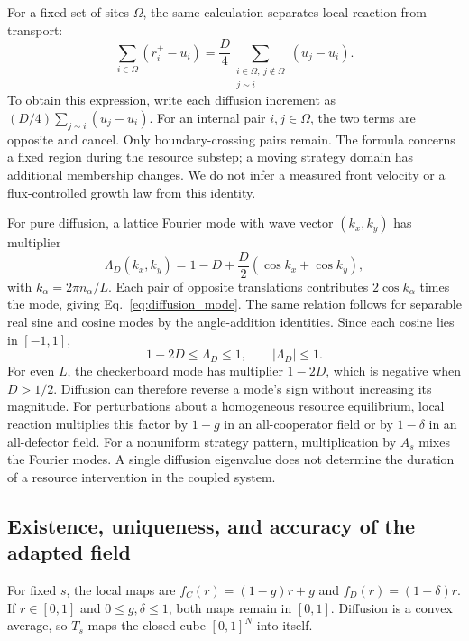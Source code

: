 For a fixed set of sites $\Omega$, the same calculation separates local reaction from transport:
\begin{equation}
\label{eq:flux}
\sum_{i\in\Omega}(r_i^+-u_i)
=\frac D4
\sum_{\substack{i\in\Omega,\ j\notin\Omega\\j\sim i}}
(u_j-u_i).
\end{equation}
To obtain this expression, write each diffusion increment as $(D/4)\sum_{j\sim i}(u_j-u_i)$. For an internal pair $i,j\in\Omega$, the two terms are opposite and cancel. Only boundary-crossing pairs remain. The formula concerns a fixed region during the resource substep; a moving strategy domain has additional membership changes. We do not infer a measured front velocity or a flux-controlled growth law from this identity.

For pure diffusion, a lattice Fourier mode with wave vector $(k_x,k_y)$ has multiplier
\begin{equation}
\label{eq:diffusion_mode}
\Lambda_D(k_x,k_y)=
1-D+\frac D2(\cos k_x+\cos k_y),
\end{equation}
with $k_\alpha=2\pi n_\alpha/L$. Each pair of opposite translations contributes $2\cos k_\alpha$ times the mode, giving Eq.~\eqref{eq:diffusion_mode}. The same relation follows for separable real sine and cosine modes by the angle-addition identities. Since each cosine lies in $[-1,1]$,
\begin{equation}
\label{eq:mode_bound}
1-2D\le\Lambda_D\le1,
\qquad |\Lambda_D|\le1.
\end{equation}
For even $L$, the checkerboard mode has multiplier $1-2D$, which is negative when $D>1/2$. Diffusion can therefore reverse a mode's sign without increasing its magnitude. For perturbations about a homogeneous resource equilibrium, local reaction multiplies this factor by $1-g$ in an all-cooperator field or by $1-\delta$ in an all-defector field. For a nonuniform strategy pattern, multiplication by $A_s$ mixes the Fourier modes. A single diffusion eigenvalue does not determine the duration of a resource intervention in the coupled system.

\subsection{Existence, uniqueness, and accuracy of the adapted field}

For fixed $s$, the local maps are $f_C(r)=(1-g)r+g$ and $f_D(r)=(1-\delta)r$. If $r\in[0,1]$ and $0\le g,\delta\le1$, both maps remain in $[0,1]$. Diffusion is a convex average, so $T_s$ maps the closed cube $[0,1]^N$ into itself.


